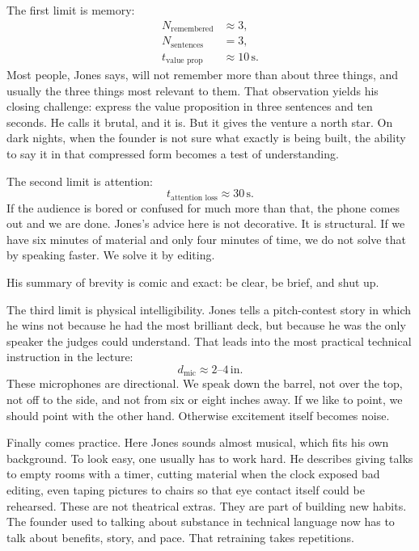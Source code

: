 The first limit is memory:
\begin{align}
N_{\text{remembered}} &\approx 3,\\
N_{\text{sentences}} &= 3,\\
t_{\text{value prop}} &\approx 10\,\text{s}.
\end{align}
Most people, Jones says, will not remember more than about three things, and usually the three things most relevant to them. That observation yields his closing challenge: express the value proposition in three sentences and ten seconds. He calls it brutal, and it is. But it gives the venture a north star. On dark nights, when the founder is not sure what exactly is being built, the ability to say it in that compressed form becomes a test of understanding.

The second limit is attention:
\begin{equation}
t_{\text{attention loss}} \approx 30\,\text{s}.
\end{equation}
If the audience is bored or confused for much more than that, the phone comes out and we are done. Jones's advice here is not decorative. It is structural. If we have six minutes of material and only four minutes of time, we do not solve that by speaking faster. We solve it by editing.

His summary of brevity is comic and exact: be clear, be brief, and shut up.

The third limit is physical intelligibility. Jones tells a pitch-contest story in which he wins not because he had the most brilliant deck, but because he was the only speaker the judges could understand. That leads into the most practical technical instruction in the lecture:
\begin{equation}
d_{\text{mic}} \approx 2\text{--}4\,\text{in}.
\end{equation}
These microphones are directional. We speak down the barrel, not over the top, not off to the side, and not from six or eight inches away. If we like to point, we should point with the other hand. Otherwise excitement itself becomes noise.

Finally comes practice. Here Jones sounds almost musical, which fits his own background. To look easy, one usually has to work hard. He describes giving talks to empty rooms with a timer, cutting material when the clock exposed bad editing, even taping pictures to chairs so that eye contact itself could be rehearsed. These are not theatrical extras. They are part of building new habits. The founder used to talking about substance in technical language now has to talk about benefits, story, and pace. That retraining takes repetitions.

